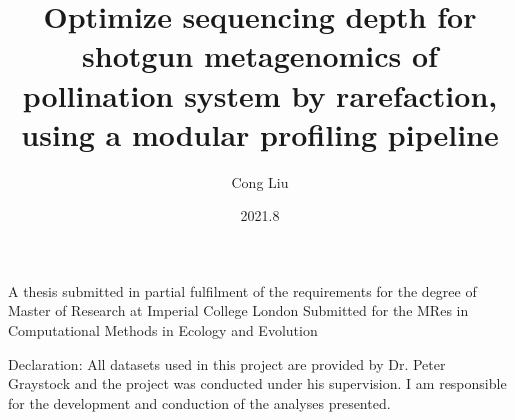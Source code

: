 \documentclass[11pt]{article}
\title{Optimize sequencing depth for shotgun metagenomics of pollination system by rarefaction, using a modular profiling pipeline}
\author{Cong Liu}
\date{2021.8}
\begin{document}


  \maketitle
  \vspace*{\fill}
  \begin{center}
    A thesis submitted in partial fulfilment of the requirements for the degree of Master of Research at Imperial College London
    \newline
    Submitted for the MRes in Computational Methods in Ecology and Evolution
  \end{center}

  \newpage
  Declaration:
  \newline
  All datasets used in this project are provided by Dr. Peter Graystock and the project was conducted under his supervision. 
  I am responsible for the development and conduction of the analyses presented.
\end{document}
